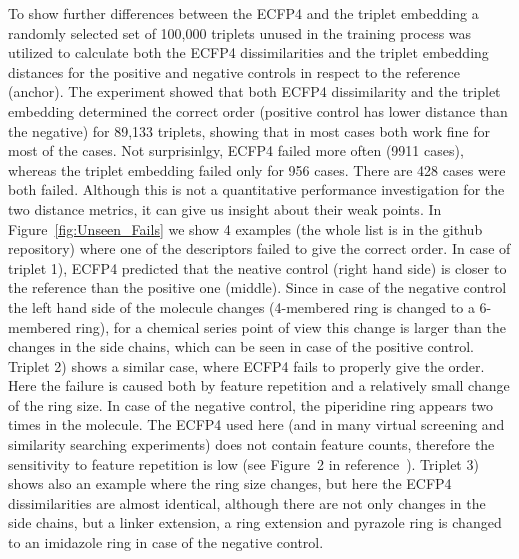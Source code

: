 \documentclass[doublespacing]{bmcart}
\begin{document}
To show further differences between the ECFP4 and the triplet embedding a randomly selected set of 100,000 triplets unused in the training process was utilized to calculate  both the ECFP4 dissimilarities and the triplet embedding distances for the positive and negative controls in respect to the reference (anchor). The experiment showed that both ECFP4 dissimilarity and the triplet embedding determined the correct order (positive control has lower distance than the negative) for 89,133 triplets, showing that in most cases both work fine for most of the cases. Not surprisinlgy, ECFP4 failed more often (9911 cases), whereas the triplet embedding failed only for 956 cases. There are 428 cases were both failed. Although this is not a quantitative performance investigation for the two distance metrics, it can give us insight about their weak points. In Figure~\ref{fig:Unseen_Fails} we show 4 examples (the whole list is in the github repository) where one of the descriptors failed to give the correct order. In case of triplet 1), ECFP4 predicted that the neative control (right hand side) is closer to the reference than the positive one (middle). Since in case of the negative control the left hand side of the molecule changes (4-membered ring is changed to a 6-membered ring), for a chemical series point of view this change is larger than the changes in the side chains, which can be seen in case of the positive control.
Triplet 2) shows a similar case, where ECFP4 fails to properly give the order. Here the failure is caused both by feature repetition and a relatively small change of the ring size. In case of the negative control, the piperidine ring appears two times in the molecule. The ECFP4 used here (and in many virtual screening and similarity searching experiments) does not contain feature counts, therefore the sensitivity to feature repetition is low (see Figure~2 in reference~\cite{flower1998properties}). Triplet 3) shows also an example where the ring size changes, but here the ECFP4 dissimilarities are almost identical, although there are not only changes in the side chains, but a linker extension, a ring extension and pyrazole ring is changed to an imidazole ring in case of the negative control. 
\end{document}
